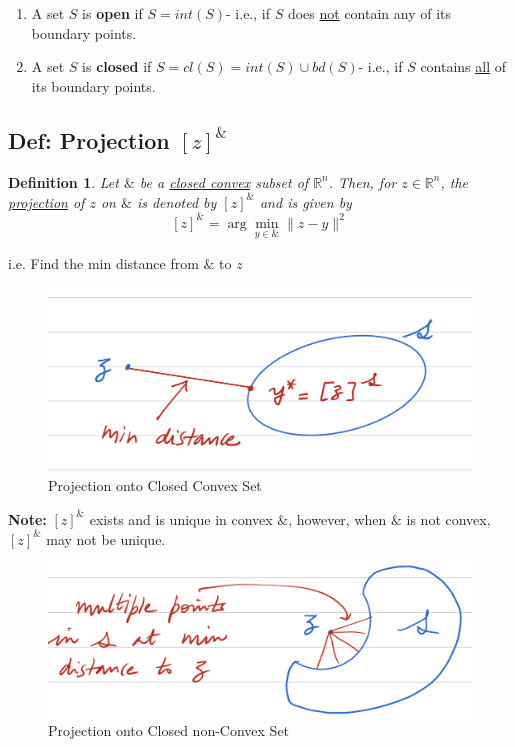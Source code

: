 \documentclass[11pt,a4paper]{article}
\newtheorem{definition}{Definition}
\begin{document}
\begin{enumerate}[(1)]
    \item A set $S$ is \textbf{open} if $S=int(S)$- i.e., if $S$ does \underline{not} contain any of its boundary points.
    \item A set $S$ is \textbf{closed} if $S=cl(S)=int(S)\cup bd(S)$- i.e., if $S$ contains \underline{all} of its boundary points.
\end{enumerate}

\subsection{Def: Projection $[z]^\&$}
\begin{definition}
    Let $\&$ be a \underline{closed convex} subset of $\mathbb{R}^n$. Then, for $z\in \mathbb{R}^n$, the \underline{projection} of $z$ on $\&$ is denoted by $[z]^\&$ and is given by
    $$[z]^\&=\arg \min_{y\in \&}\|z-y\|^2$$
\end{definition}
i.e. Find the min distance from $\&$ to $z$
\begin{center}\begin{figure}[htbp]
    \centering
    \includegraphics[scale=0.5]{projection1.png}
    \caption{Projection onto Closed Convex Set}
    \label{}
\end{figure}\end{center}
\textbf{Note:} $[z]^\&$ exists and is unique in convex $\&$, however, when $\&$ is not convex, $[z]^\&$ may not be unique.
\begin{center}\begin{figure}[htbp]
    \centering
    \includegraphics[scale=0.5]{projection2.png}
    \caption{Projection onto Closed non-Convex Set}
    \label{}
\end{figure}\end{center}
\end{document}
